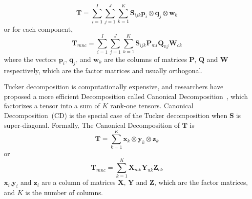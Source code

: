\begin{equation*}
\mathbf{T}=\sum\limits_{i=1}^{I}\sum\limits_{j=1}^{J}\sum\limits_{k=1}^{K}\mathbf{S}_{ijk}\mathbf{p}_i\otimes \mathbf{q}_j\otimes \mathbf{w}_k
\end{equation*}
or for each component,
\begin{equation*}
\mathbf{T}_{mnc}=\sum\limits_{i=1}^{I}\sum\limits_{j=1}^{J}\sum\limits_{k=1}^{K}\mathbf{S}_{ijk}\mathbf{P}_{m i}\mathbf{Q}_{n j}\mathbf{W}_{c k}
\end{equation*}
where the vectors $\mathbf{p}_i$, $\mathbf{q}_j$, and $\mathbf{w}_k$ are the columns of matrices $\mathbf{P}$, $\mathbf{Q}$ and $\mathbf{W}$ respectively, which are the factor matrices and usually orthogonal.


Tucker decomposition is computationally expensive, and researchers have proposed a more efficient Decomposition called Canonical Decomposition~\cite{carroll1970analysis}, which factorizes a tensor into a sum of $K$ rank-one tensors.
Canonical Decomposition~(CD) is the special case of the Tucker decomposition when $\mathbf{S}$ is super-diagonal.
Formally, The Canonical Decomposition of $\mathbf{T}$ is
\begin{equation*}
\mathbf{T}=\sum\limits_{k=1}^{K}\mathbf{x}_k\otimes \mathbf{y}_k\otimes \mathbf{z}_k
\end{equation*}
or
\begin{equation*}
\mathbf{T}_{mnc}=\sum\limits_{k=1}^{K}\mathbf{X}_{m k} \mathbf{Y}_{n k} \mathbf{Z}_{c k}
\end{equation*}
$\mathbf{x}_i$,$\mathbf{y}_i$ and $\mathbf{z}_i$ are a column of matrices $\mathbf{X}$, $\mathbf{Y}$ and $\mathbf{Z}$, which are the factor matrices, and $K$ is the number of columns. 


